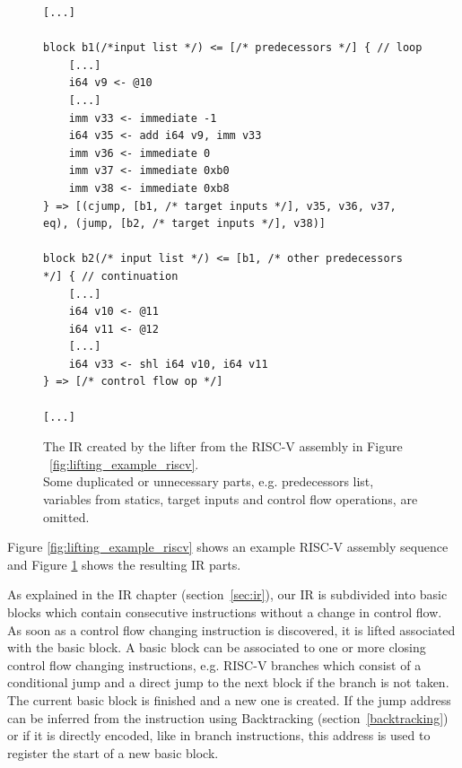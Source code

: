 \documentclass[course=eragp]{aspdoc}
\begin{document}
\begin{figure}[H]
    \centering
    \begin{lstlisting}
[...]

block b1(/*input list */) <= [/* predecessors */] { // loop
    [...]
    i64 v9 <- @10
    [...]
    imm v33 <- immediate -1
    i64 v35 <- add i64 v9, imm v33
    imm v36 <- immediate 0
    imm v37 <- immediate 0xb0
    imm v38 <- immediate 0xb8
} => [(cjump, [b1, /* target inputs */], v35, v36, v37, eq), (jump, [b2, /* target inputs */], v38)]

block b2(/* input list */) <= [b1, /* other predecessors */] { // continuation
    [...]
    i64 v10 <- @11
    i64 v11 <- @12
    [...]
    i64 v33 <- shl i64 v10, i64 v11
} => [/* control flow op */]

[...]
    \end{lstlisting}
    \caption{The IR created by the lifter from the RISC-V assembly in Figure
        ~\ref{fig:lifting_example_riscv}. \\
        Some duplicated or unnecessary parts, e.g. predecessors list, variables from statics, target
        inputs and control flow operations, are omitted.}
    \label{fig:lifting_example_ir}
\end{figure}

\par

Figure \ref{fig:lifting_example_riscv} shows an example RISC-V assembly sequence and Figure
\ref{fig:lifting_example_ir} shows the resulting IR parts.

\par

As explained in the IR chapter (section~\ref{sec:ir}), our IR is subdivided into basic blocks which contain
consecutive instructions without a change in control flow. As soon as a control flow changing
instruction is discovered, it is lifted associated with the basic block. A basic block can be
associated to one or more closing control flow changing
instructions, e.g. RISC-V branches which consist of a conditional
jump and a direct jump to the next block if the branch is not taken. The current basic block is finished and
a new one is created. If the jump address can be inferred from the instruction using
Backtracking (section~\ref{backtracking}) or if it is directly encoded, like in branch instructions, this address is used
to register the start of a new basic block.

\par
\end{document}

